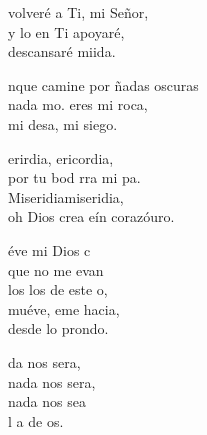 \documentclass[12pt]{article}
\begin{document}
\begin{multicols*}{2}
\begin{cancion}%
	 volveré a Ti, mi Señor,\\
	y lo en Ti apoyaré,\\
	descansaré miida.\\
\end{cancion}%

\begin{cancion}[Mi roca][Ixcís]%
	nque camine por ñadas oscuras\\
	nada mo.  eres mi roca,\\
	mi desa, mi siego.\\
\end{cancion}%

\begin{cancion}[Misericordia][Ixcís]%
	erirdia, ericordia,\\
	por tu bod rra mi pa.\\
	Miseridiamiseridia,\\
	oh Dios crea eín corazóuro.  \\
\end{cancion}%

\begin{cancion}%
	éve mi Dios c \\
	que no me evan \\
	los los de este o,\\
	muéve, eme hacia, \\
	desde lo prondo.\\
\end{cancion}%

\begin{cancion}%
	da nos sera, \\
	nada nos sera, \\
	nada nos sea\\
	l a de os.\\
\end{cancion}%


\end{multicols*}
\end{document}
